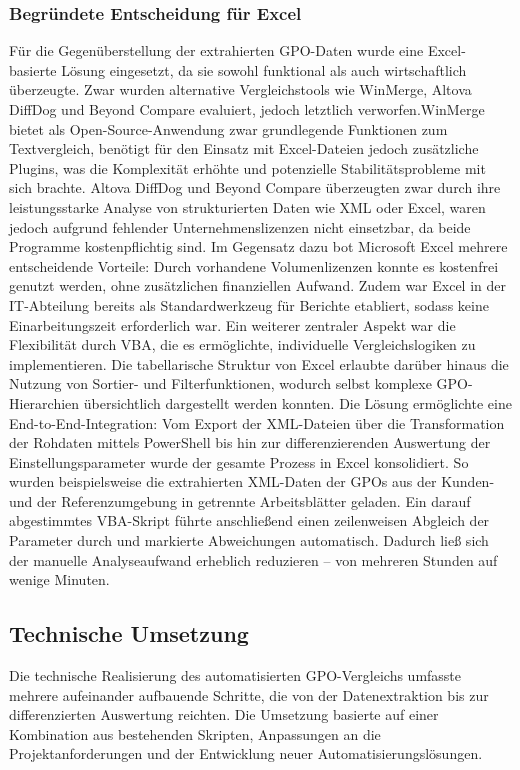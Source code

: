 \subsubsection{Begründete Entscheidung für Excel}
    Für die Gegenüberstellung der extrahierten GPO-Daten wurde eine Excel-basierte Lösung eingesetzt, da sie sowohl funktional als auch wirtschaftlich überzeugte. Zwar wurden alternative Vergleichstools wie WinMerge, Altova DiffDog und Beyond Compare evaluiert, jedoch letztlich verworfen.\newline WinMerge bietet als Open-Source-Anwendung zwar grundlegende Funktionen zum Textvergleich, benötigt für den Einsatz mit Excel-Dateien jedoch zusätzliche Plugins, was die Komplexität erhöhte und potenzielle Stabilitätsprobleme mit sich brachte. Altova DiffDog und Beyond Compare überzeugten zwar durch ihre leistungsstarke Analyse von strukturierten Daten wie XML oder Excel, waren jedoch aufgrund fehlender Unternehmenslizenzen nicht einsetzbar, da beide Programme kostenpflichtig sind.\newline
    Im Gegensatz dazu bot Microsoft Excel mehrere entscheidende Vorteile: Durch vorhandene Volumenlizenzen konnte es kostenfrei genutzt werden, ohne zusätzlichen finanziellen Aufwand. Zudem war Excel in der IT-Abteilung bereits als Standardwerkzeug für Berichte etabliert, sodass keine Einarbeitungszeit erforderlich war. Ein weiterer zentraler Aspekt war die Flexibilität durch VBA, die es ermöglichte, individuelle Vergleichslogiken zu implementieren. Die tabellarische Struktur von Excel erlaubte darüber hinaus die Nutzung von Sortier- und Filterfunktionen, wodurch selbst komplexe GPO-Hierarchien übersichtlich dargestellt werden konnten.\newline
    Die Lösung ermöglichte eine End-to-End-Integration: Vom Export der XML-Dateien über die Transformation der Rohdaten mittels PowerShell bis hin zur differenzierenden Auswertung der Einstellungsparameter wurde der gesamte Prozess in Excel konsolidiert. So wurden beispielsweise die extrahierten XML-Daten der GPOs aus der Kunden- und der Referenzumgebung in getrennte Arbeitsblätter geladen. Ein darauf abgestimmtes VBA-Skript führte anschließend einen zeilenweisen Abgleich der Parameter durch und markierte Abweichungen automatisch. Dadurch ließ sich der manuelle Analyseaufwand erheblich reduzieren – von mehreren Stunden auf wenige Minuten.
\subsection{Technische Umsetzung}
    Die technische Realisierung des automatisierten GPO-Vergleichs umfasste mehrere aufeinander aufbauende Schritte, die von der Datenextraktion bis zur differenzierten Auswertung reichten. Die Umsetzung basierte auf einer Kombination aus bestehenden Skripten, Anpassungen an die Projektanforderungen und der Entwicklung neuer Automatisierungslösungen.
